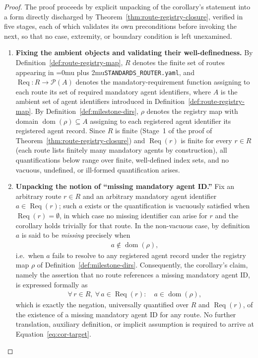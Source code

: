 \documentclass[12pt]{article}
\theoremstyle{definition}
\DeclareRobustCommand{\code}[1]{\begingroup\Urlmuskip=0mu plus 2mu\relax\nolinkurl{#1}\endgroup}
\begin{document}
\begin{proof}
The proof proceeds by explicit unpacking of the corollary's statement
into a form directly discharged by
Theorem~\ref{thm:route-registry-closure}, verified in five stages,
each of which validates its own preconditions before invoking the
next, so that no case, extremity, or boundary condition is left
unexamined.

\begin{enumerate}
      \item \textbf{Fixing the ambient objects and validating their
      well-definedness.} By Definition~\ref{def:route-registry-map},
      $R$ denotes the finite set of routes appearing in
      \code{STANDARDS\_ROUTER.yaml}, and
      $\operatorname{Req} : R \to \mathcal{P}(A)$ denotes the
      mandatory-requirement function assigning to each route its set
      of required mandatory agent identifiers, where $A$ is the
      ambient set of agent identifiers introduced in
      Definition~\ref{def:route-registry-map}. By
      Definition~\ref{def:milestone-dirs}, $\rho$ denotes the
      registry map with domain $\operatorname{dom}(\rho) \subseteq A$
      assigning to each registered agent identifier its registered
      agent record. Since $R$ is finite (Stage~1 of the proof of
      Theorem~\ref{thm:route-registry-closure}) and
      $\operatorname{Req}(r)$ is finite for every $r \in R$ (each
      route lists finitely many mandatory agents by construction),
      all quantifications below range over finite, well-defined
      index sets, and no vacuous, undefined, or ill-formed
      quantification arises.

      \item \textbf{Unpacking the notion of ``missing mandatory
      agent ID.''} Fix an arbitrary route $r \in R$ and an arbitrary
      mandatory agent identifier $a \in \operatorname{Req}(r)$; such
      $a$ exists or the quantification is vacuously satisfied when
      $\operatorname{Req}(r) = \emptyset$, in which case no missing
      identifier can arise for $r$ and the corollary holds trivially
      for that route. In the non-vacuous case, by definition $a$ is
      said to be \emph{missing} precisely when
      \begin{align}
        a \notin \operatorname{dom}(\rho),
      \end{align}
      i.e.\ when $a$ fails to resolve to any registered agent record
      under the registry map $\rho$ of
      Definition~\ref{def:milestone-dirs}. Consequently, the
      corollary's claim, namely the assertion that no route
      references a missing mandatory agent ID, is expressed formally
      as
      \begin{align}
        \forall\, r \in R,\ \forall\, a \in \operatorname{Req}(r):
        \quad a \in \operatorname{dom}(\rho),
        \label{eq:cor-target}
      \end{align}
      which is exactly the negation, universally quantified over $R$
      and $\operatorname{Req}(r)$, of the existence of a missing
      mandatory agent ID for any route. No further translation,
      auxiliary definition, or implicit assumption is required to
      arrive at Equation~\eqref{eq:cor-target}.


\end{enumerate}
\end{proof}
\end{document}
